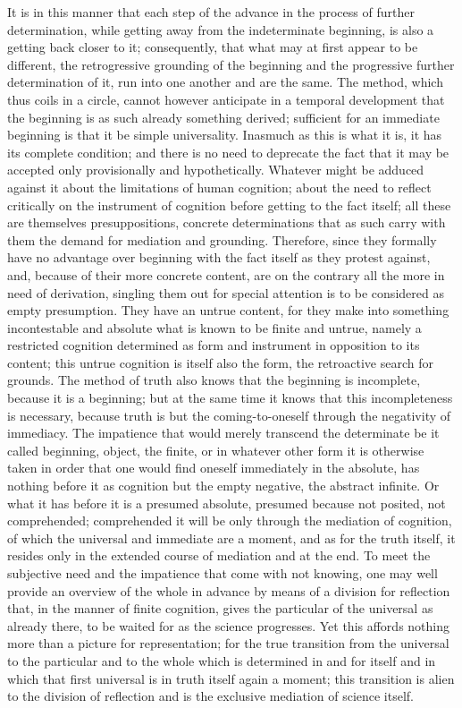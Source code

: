 It is in this manner that each step of the advance
in the process of further determination,
while getting away from the indeterminate beginning,
is also a getting back closer to it;
consequently, that what may at first appear to be different,
the retrogressive grounding of the beginning
and the progressive further determination of it,
run into one another and are the same.
The method, which thus coils in a circle,
cannot however anticipate in a temporal development
that the beginning is as such already something derived;
sufficient for an immediate beginning is that it be simple universality.
Inasmuch as this is what it is, it has its complete condition;
and there is no need to deprecate the fact that
it may be accepted only provisionally and hypothetically.
Whatever might be adduced against it about
the limitations of human cognition;
about the need to reflect critically
on the instrument of cognition
before getting to the fact itself;
all these are themselves presuppositions,
concrete determinations that as such carry
with them the demand for mediation and grounding.
Therefore, since they formally have no advantage
over beginning with the fact itself as they protest against,
and, because of their more concrete content,
are on the contrary all the more in need of derivation,
singling them out for special attention
is to be considered as empty presumption.
They have an untrue content,
for they make into something
incontestable and absolute
what is known to be finite and untrue,
namely a restricted cognition
determined as form and instrument
in opposition to its content;
this untrue cognition is itself also the form,
the retroactive search for grounds.
The method of truth also knows that the beginning is incomplete,
because it is a beginning;
but at the same time it knows that
this incompleteness is necessary,
because truth is but the coming-to-oneself
through the negativity of immediacy.
The impatience that would merely transcend the determinate
be it called beginning, object, the finite,
or in whatever other form it is otherwise taken
in order that one would find oneself immediately in the absolute,
has nothing before it as cognition
 but the empty negative, the abstract infinite.
Or what it has before it is a presumed absolute,
presumed because not posited, not comprehended;
comprehended it will be only through the mediation of cognition,
of which the universal and immediate are a moment,
and as for the truth itself,
it resides only in the extended course of mediation and at the end.
To meet the subjective need and the impatience
that come with not knowing,
one may well provide an overview of the whole in advance
by means of a division for reflection that,
in the manner of finite cognition,
gives the particular of the universal as already there, to be waited
for as the science progresses.
Yet this affords nothing more than a picture
for representation;
for the true transition from the universal
to the particular and to the whole
which is determined in and for itself
and in which that first universal is in truth
itself again a moment;
this transition is alien to the division of reflection
and is the exclusive mediation of science itself.

